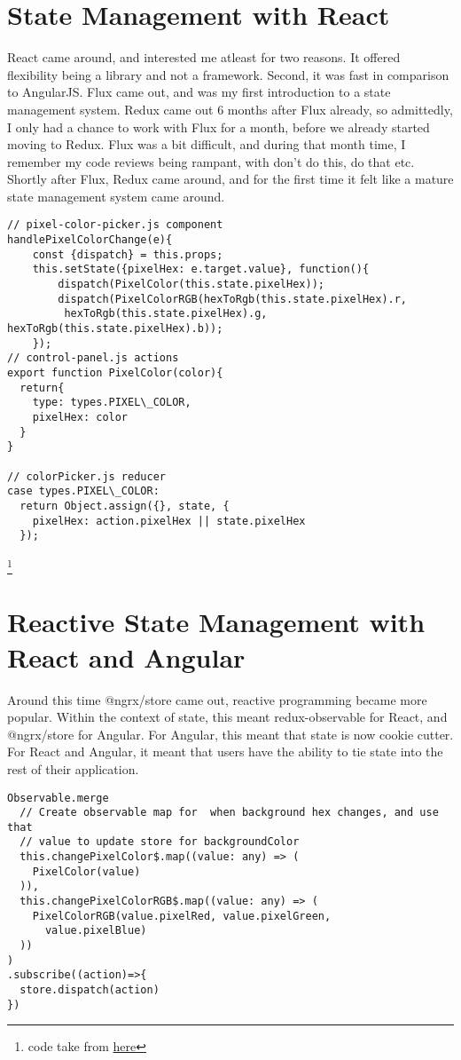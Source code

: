 \section{ State Management with React }
React came around, and interested me atleast for two reasons. It offered
flexibility being a library and not a framework. Second, it was fast in
comparison to AngularJS. Flux came out, and was my first introduction to a
state management system. Redux came out 6 months after Flux already, so
admittedly, I only had a chance to work with Flux for a month, before we already
started moving to Redux. Flux was a bit difficult, and during that month time,
I remember my code reviews being rampant, with don't do this, do that etc.
Shortly after Flux, Redux came around, and for the first time it felt like a
mature state management system came around.

\begin{lstlisting}
// pixel-color-picker.js component
handlePixelColorChange(e){
    const {dispatch} = this.props;
    this.setState({pixelHex: e.target.value}, function(){
        dispatch(PixelColor(this.state.pixelHex));
        dispatch(PixelColorRGB(hexToRgb(this.state.pixelHex).r,
         hexToRgb(this.state.pixelHex).g, hexToRgb(this.state.pixelHex).b));
    });
// control-panel.js actions
export function PixelColor(color){
  return{
    type: types.PIXEL\_COLOR,
    pixelHex: color
  }
}

// colorPicker.js reducer
case types.PIXEL\_COLOR:
  return Object.assign({}, state, {
    pixelHex: action.pixelHex || state.pixelHex
  });
\end{lstlisting}
\footnote{code take from \href{https://github.com/CharlieGreenman/pixelLight}{here}}

\section{ Reactive State Management with React and Angular }
Around this time @ngrx/store came out, reactive programming became more popular.
Within the context of state, this meant redux-observable for React, and
@ngrx/store for Angular. For Angular, this meant that state is now cookie
cutter. For React and Angular, it meant that users have the ability to tie state into the
rest of their application.

\begin{lstlisting}
Observable.merge
  // Create observable map for  when background hex changes, and use that
  // value to update store for backgroundColor
  this.changePixelColor$.map((value: any) => (
    PixelColor(value)
  )),
  this.changePixelColorRGB$.map((value: any) => (
    PixelColorRGB(value.pixelRed, value.pixelGreen,
      value.pixelBlue)
  ))
)
.subscribe((action)=>{
  store.dispatch(action)
})
\end{lstlisting}

